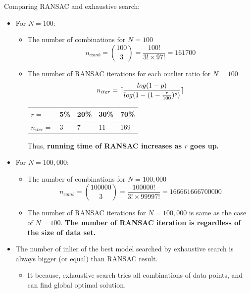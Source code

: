 \documentclass[paper=a4, fontsize=11pt]{scrartcl} %
\DeclarePairedDelimiter{\ceil}{\lceil}{\rceil}
\numberwithin{equation}{section} %
\numberwithin{figure}{section} %
\numberwithin{table}{section} %
\begin{document}
Comparing RANSAC and exhaustive search:

\begin{itemize}
\item For $N = 100$:
    \begin{itemize}
        \item The number of combinations for $N = 100$ 
            \begin{equation*}
            n_{comb} = \binom{100}{3}=\frac{100!}{3! \times 97!}=161700
            \end{equation*}
        \item The number of RANSAC iterations for each outlier ratio for $N = 100$
            \begin{equation*}
            n_{iter} = \ceil{ \frac{log(1 - p)}{log(1 - (1 - \frac{r}{100}) ^ {s})} }
            \end{equation*}
            \begin{center}
                \begin{tabular}{ | l | l | l | l | l | }
                \hline
                $r =$ & 5\% & 20\% & 30\% & 70\% \\ \hline
                $n_{iter} = $ & 3 & 7 & 11 & 169 \\ \hline
                \end{tabular}
        \end{center}
        Thus, \textbf{running time of RANSAC increases as $r$ goes up.}
	\end{itemize}
\item For $N= 100,000$:
	\begin{itemize}
            \item The number of combinations for $N = 100,000$ 
            \begin{equation*}
            n_{comb} = \binom{100000}{3}=\frac{100000!}{3! \times 99997!}=166661666700000
            \end{equation*}
            \item The number of RANSAC iterations for $N = 100,000$ is same as the case of $N = 100$. \textbf{The number of RANSAC iteration is regardless of the size of data set.}
	\end{itemize}
\item The number of inlier of the best model searched by exhaustive search is always bigger (or equal) than RANSAC result.
	\begin{itemize}
		\item It because, exhaustive search tries all combinations of data points, and can find global optimal solution. 

\end{itemize}
\end{itemize}
\end{document}
